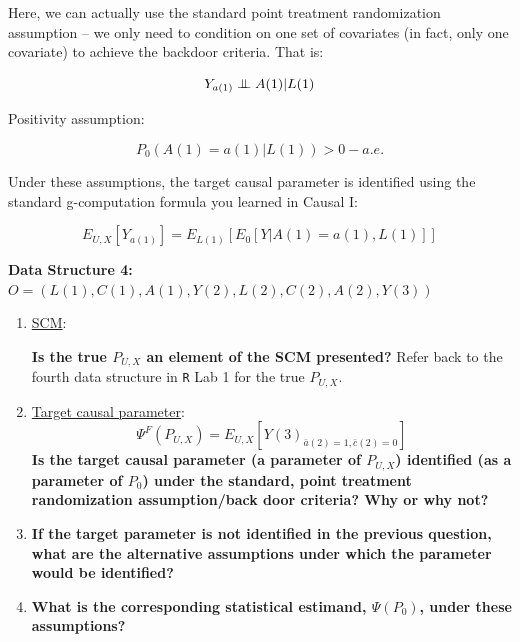 \documentclass[answers]{exam}
\newenvironment{packed_item}{
\begin{itemize}
 \setlength{\itemsep}{0pt}
  \setlength{\parskip}{0pt}
  \setlength{\parsep}{0pt}
}{\end{itemize}}
\newcommand\independent{\protect\mathpalette{\protect\independenT}{\perp}}
\def\independenT#1#2{\mathrel{\setbox0\hbox{$#1#2$}%
    \copy0\kern-\wd0\mkern4mu\box0}}
\begin{document}
\begin{solution}
Here, we can actually use the standard point treatment randomization assumption -- we only need to condition on one set of covariates (in fact, only one covariate) to achieve the backdoor criteria. That is:

\[
Y_{a(1)} \independent A(1) | L(1)
\]

Positivity assumption:

\[
P_0(A(1) = a(1) | L(1)) > 0 - a.e.
\]

Under these assumptions, the target causal parameter is identified using the standard g-computation formula you learned in Causal I:

\[
E_{U,X}[Y_{a(1)}]=E_{L(1)}[E_0[Y|A(1)=a(1),L(1)]]
\]

\end{solution}

\noindent\large\textbf{Data Structure 4: $O = (L(1), C(1), A(1), Y(2), L(2), C(2), A(2), Y(3))$}
\normalsize


\begin{enumerate}
\item \underline{SCM}:
\textbf{Is the true $P_{U,X}$ an element of the SCM presented?} Refer back to the fourth data structure in \texttt{R} Lab 1 for the true $P_{U,X}$.
\item \underline{Target causal parameter}:
\[
\Psi^F(P_{U,X}) = E_{U,X}[Y(3)_{\bar{a}(2)=1, \bar{c}(2)=0}]
\]
\textbf{Is the target causal parameter (a parameter of $P_{U,X}$) identified (as a parameter of $P_0$) under the standard, point treatment randomization assumption/back door criteria? Why or why not?}
\item \textbf{If the target parameter is not identified in the previous question, what are the alternative assumptions under which the parameter would be identified?}
\item \textbf{What is the corresponding statistical estimand, $\Psi(P_0)$, under these assumptions?}
\end{enumerate}
\end{document}
